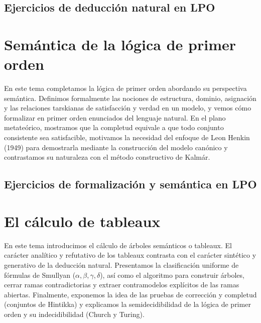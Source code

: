 \documentclass[spanish,11pt,a4paper,openany]{book}
\begin{document}


\section{Ejercicios de deducción natural en LPO}


\chapter{Semántica de la lógica de primer orden}\label{cap:sem-lpo}
\begin{resumentema}
  En este tema completamos la lógica de primer orden abordando su
  perspectiva semántica. Definimos formalmente las nociones de
  estructura, dominio, asignación y las relaciones tarskianas de
  satisfacción y verdad en un modelo, y vemos cómo formalizar en primer orden
  enunciados del lenguaje natural. En el plano metateórico, mostramos que la
  completud equivale a que todo conjunto consistente sea satisfacible,
  motivamos la necesidad del enfoque de Leon Henkin (1949) para
  demostrarla mediante la construcción del modelo canónico y contrastamos
  su naturaleza con el método constructivo de Kalmár.
\end{resumentema}



\section{Ejercicios de formalización y semántica en LPO}


\chapter{El cálculo de tableaux}\label{cap:tableaux}
\begin{resumentema}
  En este tema introducimos el cálculo de árboles semánticos o
  tableaux. El carácter analítico y refutativo de los
  tableaux contrasta con el carácter sintético y generativo de la deducción
  natural. Presentamos la clasificación uniforme de fórmulas de
  Smullyan ($\alpha, \beta, \gamma, \delta$), así como el algoritmo
  para construir árboles, cerrar ramas contradictorias y
  extraer contramodelos explícitos de las ramas abiertas. Finalmente,
  exponemos la idea de las pruebas de corrección y
  completud (conjuntos de Hintikka) y explicamos la semidecidibilidad de la
  lógica de primer orden y su indecidibilidad (Church y Turing).
\end{resumentema}
\end{document}
